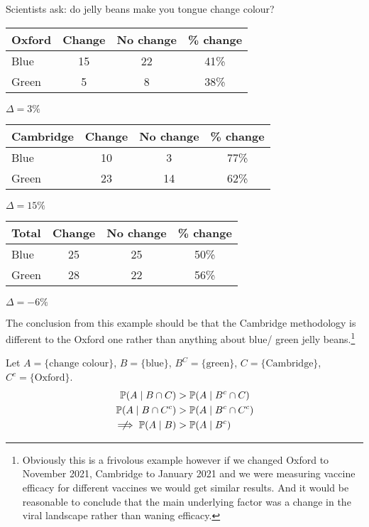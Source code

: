 \begin{example}
    Scientists ask: do jelly beans make you tongue change colour?

    \begin{center}
        \begin{tabular}{ m{2cm} |c|c|c } 
         Oxford & Change & No change & \% change \\ 
         \hline
         Blue   & 15     &  22       & 41\% \\
         Green  & 5      &  8        & 38\%
        \end{tabular}
        $\Delta = 3\%$
    \end{center}
    \begin{center}
        \begin{tabular}{ m{2cm} |c|c|c } 
            Cambridge & Change & No change & \% change \\ 
            \hline
            Blue      & 10     &  3        & 77\% \\
            Green     & 23     &  14       & 62\%
        \end{tabular}
        $\Delta = 15\%$
    \end{center} 
    \begin{center}
        \begin{tabular}{ m{2cm} |c|c|c } 
        Total  & Change & No change & \% change \\ 
        \hline
        Blue   & 25     &  25       & 50\% \\
        Green  & 28     &  22       & 56\%
        \end{tabular}
        $\Delta = -6\%$
    \end{center}

    The conclusion from this example should be that the Cambridge methodology is different to the Oxford one rather than anything about blue/ green jelly beans.\footnote{Obviously this is a frivolous example however if we changed Oxford to November 2021, Cambridge to January 2021 and we were measuring vaccine efficacy for different vaccines we would get similar results. And it would be reasonable to conclude that the main underlying factor was a change in the viral landscape rather than waning efficacy.}

    Let $A = \{\text{change colour}\}$, $B = \{\text{blue}\}$, $B^C = \{\text{green}\}$, $C = \{\text{Cambridge}\}$, $C^c = \{\text{Oxford}\}$.
    \begin{align*}
        \mathbb{P}(A \mid B \cap C) &> \mathbb{P}(A \mid B^c \cap C) \\
        \mathbb{P}(A \mid B \cap C^c) &> \mathbb{P}(A \mid B^c \cap C^c) \\
        \centernot\implies \mathbb{P}(A \mid B) &> \mathbb{P}(A \mid B^c)
    \end{align*} 
\end{example} 

